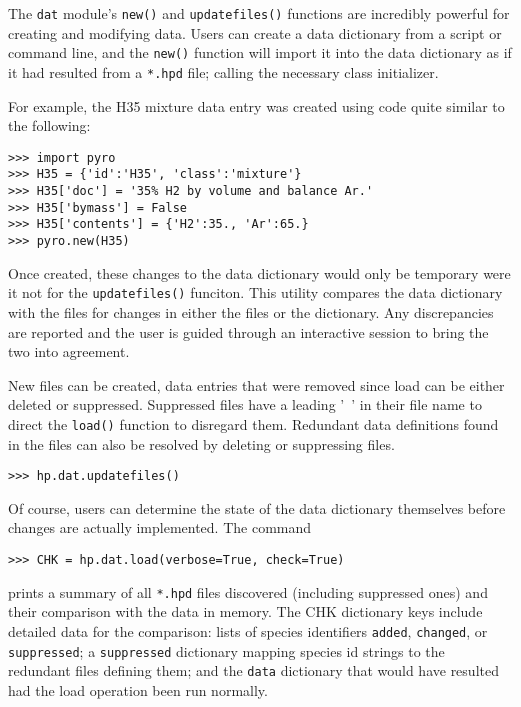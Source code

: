 The \verb|dat| module's \verb|new()| and \verb|updatefiles()| functions are incredibly powerful for creating and modifying data.  Users can create a data dictionary from a script or command line, and the \verb|new()| function will import it into the data dictionary as if it had resulted from a \verb|*.hpd| file; calling the necessary class initializer.

For example, the H35 mixture data entry was created using code quite similar to the following:
\begin{verbatim}
>>> import pyro
>>> H35 = {'id':'H35', 'class':'mixture'}
>>> H35['doc'] = '35% H2 by volume and balance Ar.'
>>> H35['bymass'] = False
>>> H35['contents'] = {'H2':35., 'Ar':65.}
>>> pyro.new(H35)
\end{verbatim}

Once created, these changes to the data dictionary would only be temporary were it not for the \verb|updatefiles()| funciton.  This utility compares the data dictionary with the files for changes in either the files or the dictionary.  Any discrepancies are reported and the user is guided through an interactive session to bring the two into agreement.

New files can be created, data entries that were removed since load can be either deleted or suppressed.  Suppressed files have a leading '~' in their file name to direct the \verb|load()| function to disregard them.  Redundant data definitions found in the files can also be resolved by deleting or suppressing files.

\begin{verbatim}
>>> hp.dat.updatefiles()
\end{verbatim}

Of course, users can determine the state of the data dictionary themselves before changes are actually implemented.  The command
\begin{verbatim}
>>> CHK = hp.dat.load(verbose=True, check=True)
\end{verbatim}
prints a summary of all \verb|*.hpd| files discovered (including suppressed ones) and their comparison with the data in memory.  The CHK dictionary keys include detailed data for the comparison: lists of species identifiers \verb|added|, \verb|changed|, or \verb|suppressed|; a \verb|suppressed| dictionary mapping species id strings to the redundant files defining them; and the \verb|data| dictionary that would have resulted had the load operation been run normally.
